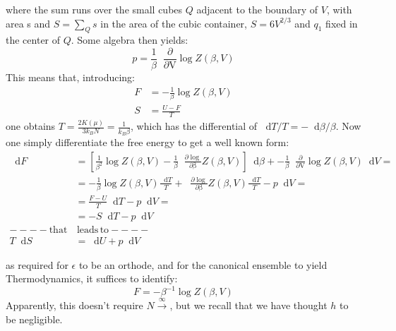 \documentclass{article}
\newcommand*\diff{\mathop{}\!\mathrm{d}}
\newcommand*\derbeta[1]{\mathop{}\!\frac{\partial #1}{\partial \mathrm{\beta}} }
\newcommand*\derV[1]{\mathop{}\!\frac{\partial #1}{\partial \mathrm{V}} }
\begin{document}
where the sum runs over the small cubes $Q$ adjacent to the boundary of $V$, with area s and $S=\sum_Q s$ in the area of the cubic container, $S = 6V^{2/3}$  and $q_1$ fixed in the center of $Q$. Some algebra then yields: 
$$ p = \frac{1}{\beta} \derV{} \log Z(\beta,V)$$
This means that, introducing:
\begin{equation*}
    \begin{aligned}
        F &= - \frac{1}{\beta} \log Z(\beta,V) \\
        S &= \frac{U-F }{T}
    \end{aligned}
\end{equation*}
one obtains $T = \frac{2 K(\mu) }{3k_B N } = \frac{1}{k_B \beta} $, which has the differential of $\diff{T}/T = -\diff{\beta}/\beta $. Now one simply differentiate the free energy to get a well known form:
\begin{equation*}
    \begin{aligned}
    \diff{F} &= [\frac{1}{\beta^2} \log Z(\beta, V) -\frac{1}{\beta}\derbeta \log Z(\beta,V)] \diff{\beta} + -\frac{1}{\beta} \derV{} \log Z(\beta,V) \diff{V} = \\
    &= -\frac{1}{\beta} \log Z(\beta,V) \frac{\diff{T}}{T}+\derbeta \log Z(\beta,V) \frac{\diff{T}}{T} - p\diff{V} =\\
    &= \frac{F - U}{T} \diff{T} - p\diff{V}=\\
    &= -S \diff{T} - p\diff{V}\\
    \mathrm{----that}& \, \mathrm{leads}  \,  \mathrm{to----}\\
    T\diff{S} &= \diff{U} +p \diff{V} 
    \end{aligned}
\end{equation*}

as required for $\epsilon$ to be an orthode, and for the canonical ensemble to yield Thermodynamics, it suffices to identify:
$$ F = -\beta^{-1} \log Z(\beta,V) $$
Apparently, this doesn't require $N\xrightarrow \infty$, but we recall that we have thought $h$ to be negligible.\\
\end{document}
